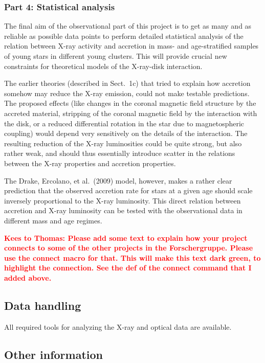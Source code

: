 \documentclass[10pt,fleqn,twoside]{article}
\newcommand{\todo}[1]{\textcolor{red}{\bf #1}}
\newcommand{\Tcol}{\color{blue}}
\begin{document}
\subsubsection*{\Tcol Part 4:  Statistical analysis}


The final aim of the observational part of this project is to get as many and as reliable as 
possible data points to perform
 detailed statistical analysis
of the relation between X-ray activity and accretion in mass- and age-stratified
samples of young stars in different young clusters. This
will provide crucial new
constraints for theoretical models of the X-ray-disk interaction.


The earlier theories (described in Sect.~1c) that tried to explain how
accretion somehow may reduce the X-ray emission, 
could not make testable predictions.
The proposed effects (like changes in the coronal magnetic field structure by the
accreted material, stripping of the coronal magnetic field 
by the interaction with the disk, or a reduced differential rotation in the star
due to magnetospheric coupling) would depend very sensitively on the details
of the interaction. The resulting reduction of the X-ray luminosities could
be quite strong, but also rather weak, and should thus essentially introduce
scatter in the relations between the X-ray properties and accretion properties.

The Drake, Ercolano, et al.~(2009) model, however, makes a rather clear
prediction that the observed accretion rate for stars at a given age
should scale inversely proportional to the X-ray luminosity.
This direct relation between accretion and X-ray luminosity can be tested with
the observational data in different mass and age regimes.



\todo{Kees to Thomas: Please add some text to explain how your project
connects to some of the other projects in the Forschergruppe. Please
use the connect macro for that. This will make this text dark green, to
highlight the connection. See the def of the connect command that I
added above.}




\subsection{\Tcol Data handling}

All required tools for analyzing the X-ray and optical data are available.

\subsection{\Tcol Other information}
\vspace{-2mm}
\end{document}
